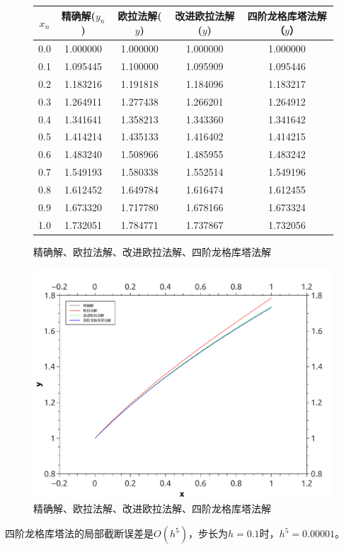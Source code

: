 \begin{figure}[htb]
\centering
\begin{tabular}{c|c|c|c|c}
$x_n$ &       精确解($y_n$)   & 欧拉法解($y$)  & 改进欧拉法解($y$) & 四阶龙格库塔法解（$y$）\\
\hline
 0.0  &      1.000000       &	1.000000	&1.000000	&1.000000\\
 0.1	&	1.095445 	&	1.100000	&1.095909	&1.095446\\
0.2	&	1.183216 	&	1.191818	&1.184096	&1.183217\\
0.3	&	1.264911 	&	1.277438	&1.266201	&1.264912\\
0.4	&	1.341641	&	1.358213	&1.343360	&1.341642\\
0.5	&	1.414214	&	1.435133	&1.416402	&1.414215\\
0.6	&	1.483240	&	1.508966	&1.485955	&1.483242\\
0.7	&	1.549193	&	1.580338	&1.552514	&1.549196\\
0.8	&	1.612452	&	1.649784	&1.616474	&1.612455\\
0.9	&	1.673320	&	1.717780	&1.678166	&1.673324\\
1.0	&	1.732051	&	1.784771	&1.737867	&1.732056
\end{tabular}
\caption{精确解、欧拉法解、改进欧拉法解、四阶龙格库塔法解}
\centering
\includegraphics[width=1.0\textwidth]{program/numerical_analysis_examples/runge_kutta.pdf}
\caption{精确解、欧拉法解、改进欧拉法解、四阶龙格库塔法解}
\label{fig:by:table}
\end{figure}

四阶龙格库塔法的局部截断误差是$O(h^5)$，步长为$h=0.1$时，$h^5=0.00001$。

